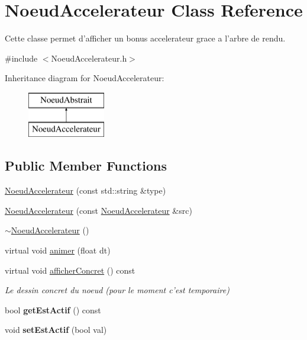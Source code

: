 \hypertarget{class_noeud_accelerateur}{\section{Noeud\-Accelerateur Class Reference}
\label{class_noeud_accelerateur}
}


Cette classe permet d'afficher un bonus accelerateur grace a l'arbre de rendu.  




{\ttfamily \#include $<$Noeud\-Accelerateur.\-h$>$}

Inheritance diagram for Noeud\-Accelerateur\-:\begin{figure}[H]
\begin{center}
\leavevmode
\includegraphics[height=2.000000cm]{class_noeud_accelerateur}
\end{center}
\end{figure}
\subsection*{Public Member Functions}
\begin{DoxyCompactItemize}
\item 
\hyperlink{class_noeud_accelerateur_a4b37b22cfb43ba30430642aeb4ec8a62}{Noeud\-Accelerateur} (const std\-::string \&type)
\item 
\hyperlink{class_noeud_accelerateur_a9f9237bb8d441b733f1a522c7d918a00}{Noeud\-Accelerateur} (const \hyperlink{class_noeud_accelerateur}{Noeud\-Accelerateur} \&src)
\item 
\hyperlink{class_noeud_accelerateur_abc2330c49066f24a13c14aba2ed88108}{$\sim$\-Noeud\-Accelerateur} ()
\item 
virtual void \hyperlink{class_noeud_accelerateur_aaad5010633c75c21af1a326bfea55777}{animer} (float dt)
\item 
virtual void \hyperlink{class_noeud_accelerateur_a9f4a4900957b211e13bd31b32688a600}{afficher\-Concret} () const 
\begin{DoxyCompactList}\small\item\em Le dessin concret du noeud (pour le moment c'est temporaire) \end{DoxyCompactList}\item 
\hypertarget{class_noeud_accelerateur_aef7e490cb71247056a57d2b3d2e9e060}{bool {\bfseries get\-Est\-Actif} () const }\label{class_noeud_accelerateur_aef7e490cb71247056a57d2b3d2e9e060}

\item 
\hypertarget{class_noeud_accelerateur_a36f42eb2a4bbc261cbdf25982fb9e633}{void {\bfseries set\-Est\-Actif} (bool val)}\label{class_noeud_accelerateur_a36f42eb2a4bbc261cbdf25982fb9e633}

\end{DoxyCompactItemize}
